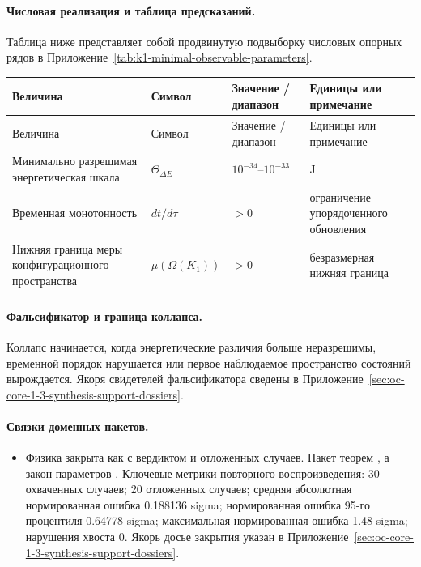 \paragraph{Числовая реализация и таблица предсказаний.}
Таблица ниже представляет собой продвинутую подвыборку числовых опорных рядов в Приложение~\ref{tab:k1-minimal-observable-parameters}.
\begin{longtable}{@{}L{0.27\textwidth}L{0.15\textwidth}L{0.24\textwidth}L{0.16\textwidth}@{}}
\toprule
Величина & Символ & Значение / диапазон & Единицы или примечание \\
\midrule
\endfirsthead
\toprule
Величина & Символ & Значение / диапазон & Единицы или примечание \\
\midrule
\endhead
Минимально разрешимая энергетическая шкала & $\scriptstyle \Theta_{\Delta E}$ & $10^{-34}\text{--}10^{-33}$ & $\mathrm{J}$ \\
Временная монотонность & $\scriptstyle dt/\allowbreak d\tau$ & $> 0$ & ограничение упорядоченного обновления \\
Нижняя граница меры конфигурационного пространства & $\scriptstyle \mu(\Omega(K_1))$ & $> 0$ & безразмерная нижняя граница \\
\bottomrule
\end{longtable}

\paragraph{Фальсификатор и граница коллапса.}
Коллапс начинается, когда энергетические различия больше неразрешимы, временной порядок нарушается или первое наблюдаемое пространство состояний вырождается.
Якоря свидетелей фальсификатора сведены в Приложение~\ref{sec:oc-core-1-3-synthesis-support-dossiers}.

\paragraph{Связки доменных пакетов.}
\begin{itemize}[leftmargin=1.6em,nosep]
\item Физика закрыта как  с вердиктом  и  отложенных случаев. Пакет теорем , а закон параметров . Ключевые метрики повторного воспроизведения: 30 охваченных случаев; 20 отложенных случаев; средняя абсолютная нормированная ошибка 0.188136 sigma; нормированная ошибка 95-го процентиля 0.64778 sigma; максимальная нормированная ошибка 1.48 sigma; нарушения хвоста 0. Якорь досье закрытия указан в Приложение~\ref{sec:oc-core-1-3-synthesis-support-dossiers}.
\end{itemize}

